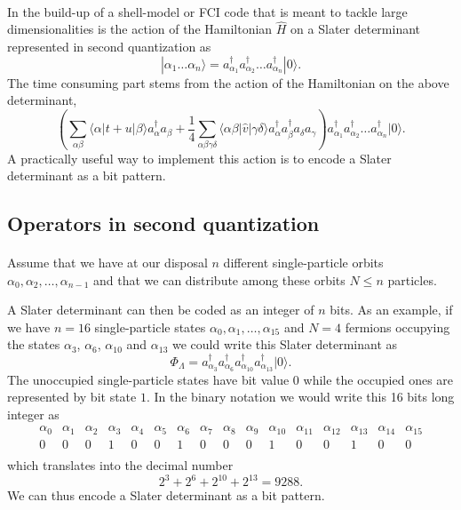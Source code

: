 \documentclass[%
twoside,                 %
final,                   %
10pt]{article}
\begin{document}
\paragraph{}
In the build-up of a shell-model or FCI code that is meant to tackle large dimensionalities
is the action of the Hamiltonian $\hat{H}$ on a
Slater determinant represented in second quantization as
\[
 |\alpha_1\dots \alpha_n\rangle = a_{\alpha_1}^{\dagger} a_{\alpha_2}^{\dagger} \dots a_{\alpha_n}^{\dagger} |0\rangle.
\]
The time consuming part stems from the action of the Hamiltonian
on the above determinant,
\[
\left(\sum_{\alpha\beta} \langle \alpha|t+u|\beta\rangle a_\alpha^{\dagger} a_\beta + \frac{1}{4} \sum_{\alpha\beta\gamma\delta}
                \langle \alpha \beta|\hat{v}|\gamma \delta\rangle a_\alpha^{\dagger} a_\beta^{\dagger} a_\delta a_\gamma\right)a_{\alpha_1}^{\dagger} a_{\alpha_2}^{\dagger} \dots a_{\alpha_n}^{\dagger} |0\rangle.
\]
A practically useful way to implement this action is to encode a Slater determinant as a bit pattern.




\subsection*{Operators in second quantization}

\paragraph{}
Assume that we have at our disposal $n$ different single-particle orbits
$\alpha_0,\alpha_2,\dots,\alpha_{n-1}$ and that we can distribute  among these orbits $N\le n$ particles.

A Slater  determinant can then be coded as an integer of $n$ bits. As an example, if we have $n=16$ single-particle states
$\alpha_0,\alpha_1,\dots,\alpha_{15}$ and $N=4$ fermions occupying the states $\alpha_3$, $\alpha_6$, $\alpha_{10}$ and $\alpha_{13}$
we could write this Slater determinant as  
\[
\Phi_{\Lambda} = a_{\alpha_3}^{\dagger} a_{\alpha_6}^{\dagger} a_{\alpha_{10}}^{\dagger} a_{\alpha_{13}}^{\dagger} |0\rangle.
\]
The unoccupied single-particle states have bit value $0$ while the occupied ones are represented by bit state $1$. 
In the binary notation we would write this   16 bits long integer as
\[
\begin{array}{cccccccccccccccc}
{\alpha_0}&{\alpha_1}&{\alpha_2}&{\alpha_3}&{\alpha_4}&{\alpha_5}&{\alpha_6}&{\alpha_7} & {\alpha_8} &{\alpha_9} & {\alpha_{10}} &{\alpha_{11}} &{\alpha_{12}} &{\alpha_{13}} &{\alpha_{14}} & {\alpha_{15}} \\
{0} & {0} &{0} &{1} &{0} &{0} &{1} &{0} &{0} &{0} &{1} &{0} &{0} &{1} &{0} & {0} \\
\end{array}
\]
which translates into the decimal number
\[
2^3+2^6+2^{10}+2^{13}=9288.
\]
We can thus encode a Slater determinant as a bit pattern.
\end{document}

